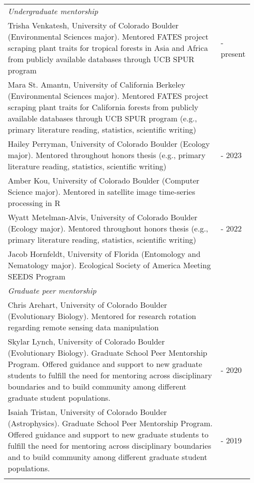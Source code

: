 \begin{longtable}{@{}>{\raggedright}p{5.25in} >{\raggedleft}X@{}}
 \addlinespace[1ex]
 
\emph{Undergraduate mentorship}  & \tabularnewline
Trisha Venkatesh, University of Colorado Boulder (Environmental Sciences major). Mentored FATES project scraping plant traits for tropical forests in Asia and Africa from publicly available databases through UCB SPUR program  & 2024 - present \tabularnewline
Mara St. Amantn, University of California Berkeley (Environmental Sciences major). Mentored FATES project scraping plant traits for California forests from publicly available databases through UCB SPUR program (e.g., primary literature reading, statistics, scientific writing)  & 2024 \tabularnewline
Hailey Perryman, University of Colorado Boulder (Ecology major). Mentored throughout honors thesis (e.g., primary literature reading, statistics, scientific writing)  & 2022 - 2023 \tabularnewline
Amber Kou, University of Colorado Boulder (Computer Science major). Mentored in satellite image time-series processing in R & 2022 \tabularnewline
Wyatt Metelman-Alvis, University of Colorado Boulder (Ecology major). Mentored throughout honors thesis (e.g., primary literature reading, statistics, scientific writing)  & 2021 - 2022 \tabularnewline
Jacob Hornfeldt, University of Florida (Entomology and Nematology major). Ecological Society of America Meeting SEEDS Program & 2020  \tabularnewline
 \addlinespace[1ex]
 
\emph{Graduate peer mentorship}  & \tabularnewline
Chris Arehart, University of Colorado Boulder (Evolutionary Biology). Mentored for research rotation regarding remote sensing data manipulation & 2021 \tabularnewline
Skylar Lynch, University of Colorado Boulder (Evolutionary Biology). Graduate School Peer Mentorship Program. Offered guidance and support to new graduate students to fulfill the need for mentoring across disciplinary boundaries and to build community among different graduate student populations. & 2019 - 2020 \tabularnewline
Isaiah Tristan, University of Colorado Boulder (Astrophysics). Graduate School Peer Mentorship Program. Offered guidance and support to new graduate students to fulfill the need for mentoring across disciplinary boundaries and to build community among different graduate student populations.  & 2018 - 2019  \tabularnewline
 \addlinespace[1ex]
 

\end{longtable}


